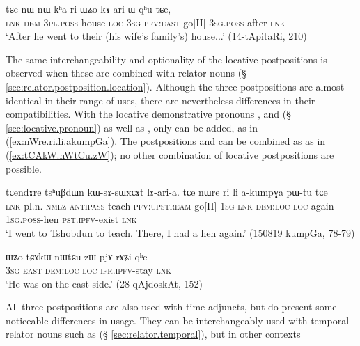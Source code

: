  \begin{exe}
\ex \label{ex:kha.ri.kari}
\gll   tɕe nɯ nɯ-kʰa ri ɯʑo kɤ-ari ɯ-qʰu tɕe, \\
\textsc{lnk} \textsc{dem} \textsc{3pl}.\textsc{poss}-house \textsc{loc} \textsc{3sg} \textsc{pfv}:\textsc{east}-go[II] \textsc{3sg}.\textsc{poss}-after \textsc{lnk} \\
\glt `After he went to their (his wife's family's) house...' (14-tApitaRi, 210)
  \end{exe}
  
The same interchangeability and optionality of the locative postpositions is observed when these are combined with relator nouns (§ \ref{sec:relator.postposition.location}). Although the three postpositions are almost identical in their range of uses, there are nevertheless differences in their compatibilities.  With the locative demonstrative pronouns , and   (§ \ref{sec:locative.pronoun}) as well as , only  can be added, as in (\ref{ex:nWre.ri.li.akumpGa}). The postpositions  and  can be combined as  as in (\ref{ex:tCAkW.nWtCu.zW}); no other combination of locative postpositions are possible.

 \begin{exe}
\ex \label{ex:nWre.ri.li.akumpGa}
\gll tɕendɤre tsʰuβdɯn kɯ-sɤ-sɯxɕɤt lɤ-ari-a. tɕe nɯre ri li a-kumpɣa pɯ-tu tɕe \\
\textsc{lnk} pl.n. \textsc{nmlz}-\textsc{antipass}-teach \textsc{pfv}:\textsc{upstream}-go[II]-\textsc{1sg} \textsc{lnk} \textsc{dem}:\textsc{loc} \textsc{loc} again \textsc{1sg}.\textsc{poss}-hen \textsc{pst}.\textsc{ipfv}-exist \textsc{lnk} \\
\glt `I went to Tshobdun to teach. There, I had a hen again.' (150819 kumpGa, 78-79)
  \end{exe}

 \begin{exe}
\ex \label{ex:tCAkW.nWtCu.zW}
\gll   ɯʑo tɕɤkɯ nɯtɕu zɯ pjɤ-rɤʑi qʰe \\
\textsc{3sg} \textsc{east} \textsc{dem}:\textsc{loc} \textsc{loc} \textsc{ifr}.\textsc{ipfv}-stay \textsc{lnk}  \\
\glt `He was on the east side.' (28-qAjdoskAt, 152)
  \end{exe}
   
All three postpositions are also used with time adjuncts, but do present some noticeable differences in usage. They can be interchangeably used with temporal relator nouns such as  (§ \ref{sec:relator.temporal}), but in other contexts 

